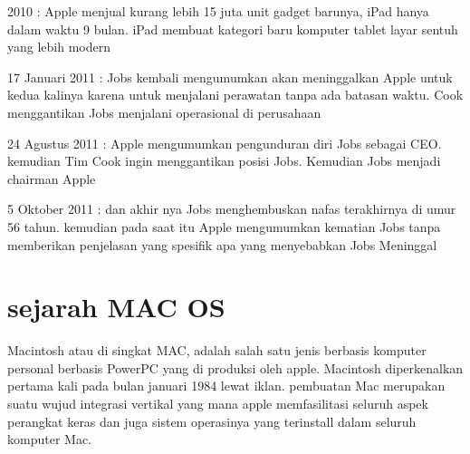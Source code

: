 2010 : Apple menjual kurang lebih 15 juta unit gadget barunya, iPad hanya dalam waktu 9 bulan. iPad membuat kategori baru komputer tablet layar sentuh yang lebih modern 

17 Januari 2011 : Jobs kembali mengumumkan akan meninggalkan Apple untuk kedua kalinya karena untuk menjalani perawatan tanpa ada batasan waktu. Cook menggantikan Jobs menjalani operasional di perusahaan

24 Agustus 2011 : Apple mengumumkan pengunduran diri Jobs sebagai CEO. kemudian Tim Cook ingin menggantikan posisi Jobs. Kemudian Jobs menjadi chairman Apple

5 Oktober 2011 : dan akhir nya Jobs menghembuskan nafas terakhirnya di umur 56 tahun. kemudian pada saat itu Apple mengumumkan kematian Jobs tanpa memberikan penjelasan yang spesifik apa yang menyebabkan Jobs Meninggal


\section{sejarah MAC OS}
Macintosh atau di singkat MAC, adalah salah satu jenis berbasis komputer personal berbasis PowerPC yang di produksi oleh apple. Macintosh diperkenalkan pertama kali pada bulan januari 1984 lewat iklan. 
pembuatan Mac merupakan suatu wujud integrasi vertikal yang mana apple memfasilitasi seluruh aspek perangkat keras dan juga sistem operasinya yang terinstall dalam seluruh komputer Mac.


